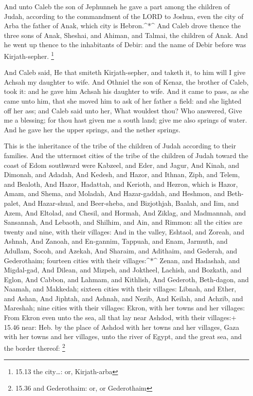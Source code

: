  And unto Caleb the son of Jephunneh he gave a part among
the children of Judah, according to the commandment of the LORD to
Joshua, even the city of Arba the father of Anak, which city is
Hebron.\^{}*\^{}  And Caleb drove thence the three sons of
Anak, Sheshai, and Ahiman, and Talmai, the children of Anak.
 And he went up thence to the inhabitants of Debir: and the
name of Debir before was Kirjath-sepher. \footnote{15.13 the city\ldots:
  or, Kirjath-arba}

 And Caleb said, He that smiteth Kirjath-sepher, and taketh
it, to him will I give Achsah my daughter to wife.  And
Othniel the son of Kenaz, the brother of Caleb, took it: and he gave him
Achsah his daughter to wife.  And it came to pass, as she
came unto him, that she moved him to ask of her father a field: and she
lighted off her ass; and Caleb said unto her, What wouldest thou?
 Who answered, Give me a blessing; for thou hast given me a
south land; give me also springs of water. And he gave her the upper
springs, and the nether springs.

 This is the inheritance of the tribe of the children of
Judah according to their families.  And the uttermost
cities of the tribe of the children of Judah toward the coast of Edom
southward were Kabzeel, and Eder, and Jagur,  And Kinah,
and Dimonah, and Adadah,  And Kedesh, and Hazor, and
Ithnan,  Ziph, and Telem, and Bealoth,  And
Hazor, Hadattah, and Kerioth, and Hezron, which is Hazor, 
Amam, and Shema, and Moladah,  And Hazar-gaddah, and
Heshmon, and Beth-palet,  And Hazar-shual, and Beer-sheba,
and Bizjothjah,  Baalah, and Iim, and Azem, 
And Eltolad, and Chesil, and Hormah,  And Ziklag, and
Madmannah, and Sansannah,  And Lebaoth, and Shilhim, and
Ain, and Rimmon: all the cities are twenty and nine, with their
villages:  And in the valley, Eshtaol, and Zoreah, and
Ashnah,  And Zanoah, and En-gannim, Tappuah, and Enam,
 Jarmuth, and Adullam, Socoh, and Azekah,  And
Sharaim, and Adithaim, and Gederah, and Gederothaim; fourteen cities
with their villages:\^{}*\^{}  Zenan, and Hadashah, and
Migdal-gad,  And Dilean, and Mizpeh, and Joktheel,
 Lachish, and Bozkath, and Eglon,  And Cabbon,
and Lahmam, and Kithlish,  And Gederoth, Beth-dagon, and
Naamah, and Makkedah; sixteen cities with their villages: 
Libnah, and Ether, and Ashan,  And Jiphtah, and Ashnah, and
Nezib,  And Keilah, and Achzib, and Mareshah; nine cities
with their villages:  Ekron, with her towns and her
villages:  From Ekron even unto the sea, all that lay near
Ashdod, with their villages:+ 15.46 near: Heb. by the place of
 Ashdod with her towns and her villages, Gaza with her
towns and her villages, unto the river of Egypt, and the great sea, and
the border thereof: \footnote{15.36 and Gederothaim: or, or Gederothaim}

